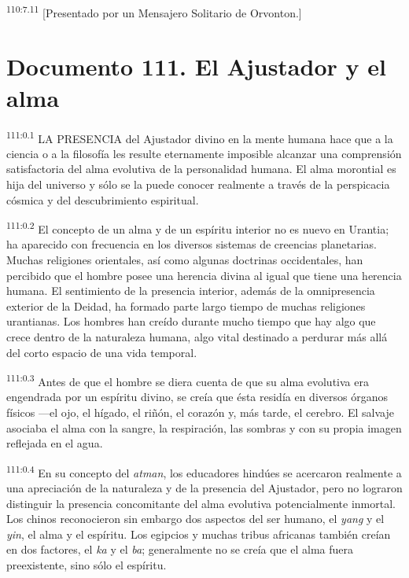 \documentclass[twoside, 11pt]{book}
\begin{document}
\par
\textsuperscript{110:7.11} [Presentado por un Mensajero Solitario de Orvonton.]


\chapter{Documento 111. El Ajustador y el alma}
\par
\textsuperscript{111:0.1} LA PRESENCIA del Ajustador divino en la mente humana hace que a la ciencia o a la filosofía les resulte eternamente imposible alcanzar una comprensión satisfactoria del alma evolutiva de la personalidad humana. El alma morontial es hija del universo y sólo se la puede conocer realmente a través de la perspicacia cósmica y del descubrimiento espiritual.

\par
\textsuperscript{111:0.2} El concepto de un alma y de un espíritu interior no es nuevo en Urantia; ha aparecido con frecuencia en los diversos sistemas de creencias planetarias. Muchas religiones orientales, así como algunas doctrinas occidentales, han percibido que el hombre posee una herencia divina al igual que tiene una herencia humana. El sentimiento de la presencia interior, además de la omnipresencia exterior de la Deidad, ha formado parte largo tiempo de muchas religiones urantianas. Los hombres han creído durante mucho tiempo que hay algo que crece dentro de la naturaleza humana, algo vital destinado a perdurar más allá del corto espacio de una vida temporal.

\par
\textsuperscript{111:0.3} Antes de que el hombre se diera cuenta de que su alma evolutiva era engendrada por un espíritu divino, se creía que ésta residía en diversos órganos físicos ---el ojo, el hígado, el riñón, el corazón y, más tarde, el cerebro. El salvaje asociaba el alma con la sangre, la respiración, las sombras y con su propia imagen reflejada en el agua.

\par
\textsuperscript{111:0.4} En su concepto del \textit{atman}, los educadores hindúes se acercaron realmente a una apreciación de la naturaleza y de la presencia del Ajustador, pero no lograron distinguir la presencia concomitante del alma evolutiva potencialmente inmortal. Los chinos reconocieron sin embargo dos aspectos del ser humano, el \textit{yang} y el \textit{yin}, el alma y el espíritu. Los egipcios y muchas tribus africanas también creían en dos factores, el \textit{ka} y el \textit{ba}; generalmente no se creía que el alma fuera preexistente, sino sólo el espíritu.
\end{document}
